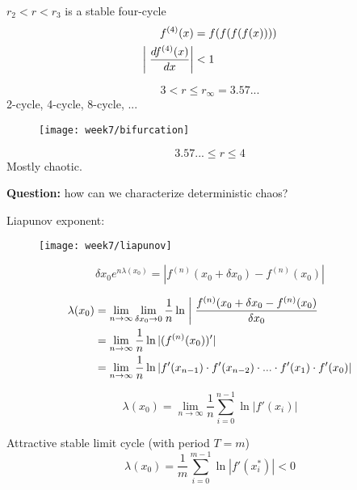 \begin{framed}
$r_2<r<r_3$ is a stable four-cycle
\begin{align}
f^{(4)}(x)&=f(f(f(f(x))))\\
\biggm\vert\frac{d f^{(4)}(x)}{d x}\bigg\vert&<1
\end{align}
\end{framed}
\begin{equation}
3<r\leq r_\infty = 3.57...
\end{equation}
2-cycle, 4-cycle, 8-cycle, ...

\begin{figure}[h]
    \centering
    \texttt{[image: week7/bifurcation]}\\
    \caption{}
    \label{fig:bifurcation}
\end{figure}

\begin{equation}
3.57... \leq r \leq 4
\end{equation}
Mostly chaotic.

\newpage
\textbf{Question:} how can we characterize deterministic chaos?

Liapunov exponent:

\begin{figure}[h]
    \centering
    \texttt{[image: week7/liapunov]}\\
    \caption{}
    \label{fig:liapunov}
\end{figure}

\begin{equation}
\delta x_0e^{n\lambda(x_0)}=|f^{(n)}(x_0+\delta x_0)-f^{(n)}(x_0)|
\end{equation}

\begin{align}
\lambda(x_0) &= \lim_{n\rightarrow\infty}\lim_{\delta x_0\rightarrow0}\frac{1}{n}\ln \biggm\vert \frac{f^{(n)}(x_0+\delta x_0-f^{(n)}(x_0)}{\delta x_0} \\
&= \lim_{n\rightarrow\infty}\frac{1}{n}\ln|(f^{(n)}(x_0))'|\\
&= \lim_{n\rightarrow\infty}\frac{1}{n}\ln|f'(x_{n-1})\cdot f'(x_{n-2})\cdot ... \cdot f'(x_{1})\cdot f'(x_{0})|
\end{align}

\begin{equation}
\lambda(x_0)=\lim_{n\rightarrow\infty}\frac{1}{n}\sum_{i=0}^{n-1}\ln|f'(x_i)|
\end{equation}

Attractive stable limit cycle (with period $T=m$)
\begin{equation}
\lambda(x_0)=\frac{1}{m}\sum_{i=0}^{m-1}\ln|f'(x_i^*)|<0
\end{equation}

